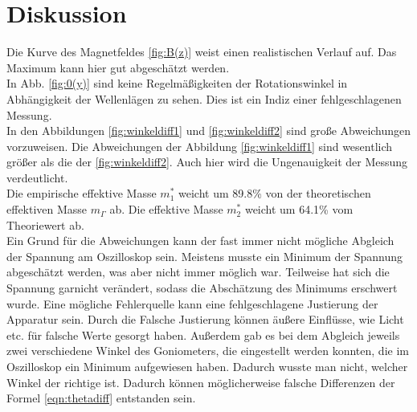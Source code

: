\section{Diskussion}

Die Kurve des Magnetfeldes \ref{fig:B(z)} weist einen realistischen Verlauf auf.
Das Maximum kann hier gut abgeschätzt werden. \\

In Abb. \ref{fig:0(y)} sind keine Regelmäßigkeiten der Rotationswinkel in Abhängigkeit der Wellenlägen zu sehen.
Dies ist ein Indiz einer fehlgeschlagenen Messung. \\

In den Abbildungen \ref{fig:winkeldiff1} und \ref{fig:winkeldiff2} sind große Abweichungen vorzuweisen.
Die Abweichungen der Abbildung \ref{fig:winkeldiff1} sind wesentlich größer als die der \ref{fig:winkeldiff2}.
Auch hier wird die Ungenauigkeit der Messung verdeutlicht. \\

Die empirische effektive Masse $m_1^*$ weicht um 89.8\% von der theoretischen effektiven Masse $m_{\Gamma}$ ab.
Die effektive Masse $m_2^*$ weicht um 64.1\% vom Theoriewert ab. \\

Ein Grund für die Abweichungen kann der fast immer nicht mögliche Abgleich der Spannung am Oszilloskop sein.
Meistens musste ein Minimum der Spannung abgeschätzt werden, was aber nicht immer möglich war.
Teilweise hat sich die Spannung garnicht verändert, sodass die Abschätzung des Minimums erschwert wurde.
Eine mögliche Fehlerquelle kann eine fehlgeschlagene Justierung der Apparatur sein.
Durch die Falsche Justierung können äußere Einflüsse, wie Licht etc. für falsche Werte gesorgt haben.
Außerdem gab es bei dem Abgleich jeweils zwei verschiedene Winkel des Goniometers, die eingestellt werden konnten,
die im Oszilloskop ein Minimum aufgewiesen haben. Dadurch wusste man nicht, welcher Winkel der richtige ist.
Dadurch können möglicherweise falsche Differenzen der Formel \eqref{eqn:thetadiff} entstanden sein.
